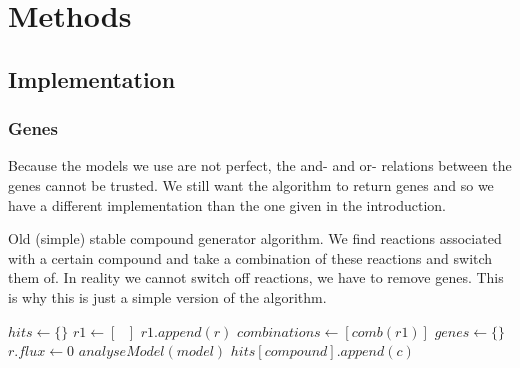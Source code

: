 \documentclass[10pt]{report}
\begin{document}
\section{Methods}
\subsection{Implementation}
\subsubsection{Genes}
Because the models we use are not perfect, the and- and or- relations between the genes cannot be trusted. We still want the algorithm to return genes and so we have a different implementation than the one given in the introduction.

\begin{algorithm}
  \caption{Old (simple) stable compound generator algorithm. We find reactions associated with a certain compound and take a combination of these reactions and switch them of. In reality we cannot switch off reactions, we have to remove genes. This is why this is just a simple version of the algorithm.}\label{alg:scg_old}
  \begin{algorithmic}[1]
        \State $hits \gets \text{\{ \}}$
        \State $r1 \gets [\text{ }]$ 
                \State $r1.append(r)$
            \EndIf
        \EndFor
            \State $combinations \gets [comb(r1)]$
            \State $genes \gets \text{\{ \}}$
                    \State $r.flux \gets 0$
                \EndFor
                \State $analyseModel(model)$
                        \State $hits[compound].append(c)$
                    \EndIf
                \EndIf
            \EndFor
        \EndIf
    \EndProcedure
  \end{algorithmic}
\end{algorithm}
\end{document}
